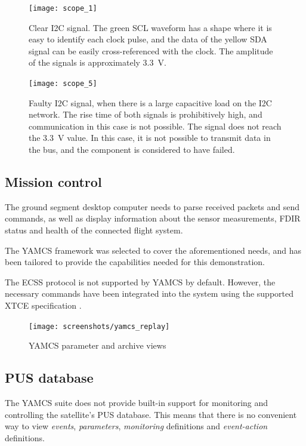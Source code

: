 \documentclass[a4paper,nobib,final]{tufte-book}
\begin{document}
\begin{figure}[h]
	\texttt{[image: scope\_1]}
	\label{subfig:i2c_clean}
	\caption[Clear I2C signal]{Clear \acs{I2C} signal. The green \acs{SCL} waveform has a shape where it is easy to identify each clock pulse, and the data of the yellow \acs{SDA} signal can be easily cross-referenced with the clock. The amplitude of the signals is approximately \SI{3.3}{\volt}.}
\end{figure}

\begin{figure}[h]
	\texttt{[image: scope\_5]}
	\caption[Faulty I2C signal]{Faulty \acs{I2C} signal, when there is a large capacitive load on the \acs{I2C} network. The rise time of both signals is prohibitively high, and communication in this case is not possible. The signal does not reach the \SI{3.3}{\volt} value. In this case, it is not possible to transmit data in the bus, and the component is considered to have failed.}
	\label{subfig:i2c_dirty}
\end{figure}

\FloatBarrier

\subsection{Mission control}

The ground segment desktop computer needs to parse received packets and send commands, as well as display information about the sensor measurements, \ac{FDIR} status and health of the connected flight system.

The \acs{YAMCS} \autocite{sela_yamcs_lightweight_2012} framework was selected to cover the aforementioned needs, and has been tailored to provide the capabilities needed for this demonstration.

The \ac{ECSS} protocol \autocite{ECSS-E-ST-70-41C} is not supported by \acs{YAMCS} by default. However, the necessary commands have been integrated into the system using the supported \ac{XTCE} specification \autocite{simon_xtce_standard_2004}.

\begin{figure}[h]
	\texttt{[image: screenshots/yamcs\_replay]}
	\caption{\acs{YAMCS} parameter and archive views}
\end{figure}

\subsection{\acs{PUS} database}
\label{sec:pusinterface}
The \acs{YAMCS} suite does not provide built-in support for monitoring and controlling the satellite's \acs{PUS} database. This means that there is no convenient way to view \emph{events}, \emph{parameters}, \emph{monitoring} definitions and \emph{event-action} definitions.
\end{document}
